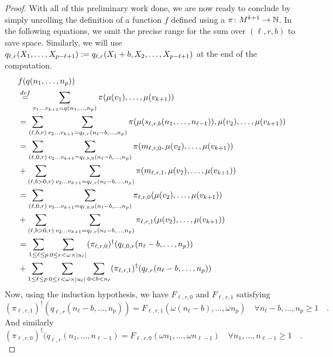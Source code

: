 \begin{proof}
	With all of this preliminary work done, we are now ready to conclude by
	simply unrolling the definition of
	a function
	$f$ defined using a 
	$\pi \colon M^{k+1} \to \mathbb{N}$.
	In the following equations, we omit the precise
	range for the sum over $(\ell, r, b)$ to save space.
	Similarly, we will use
	$q_{\ell,r}(X_1, \dots, X_{p-\ell+1})
		\mathrel{:=} q_{\ell,r}(X_1+b, X_2, \dots, X_{p - \ell + 1})$
	at the end of the computation.
	\begin{align*}
		 & f(q(n_1, \dots, n_p))           \\
		 & \eqdef
		\sum_{v_1 \dots v_{k+1} = q(n_1, \dots, n_p)}
		\pi(\mu(v_1), \dots, \mu(v_{k+1})) \\
		 & = \sum_{(\ell, b, r)}
		\sum_{v_2 \dots v_{k+1} = q_{\ell,r}(n_\ell - b, \dots, n_p)}
		\pi(\mu(s_{\ell,r,b}(n_1, \dots, n_{\ell-1})), \mu(v_2), \dots, \mu(v_{k+1}))
		\\
		 & =
		\sum_{(\ell, 0, r)}
		\sum_{v_2 \dots v_{k+1} = q_{\ell,b,0}(n_\ell - b, \dots, n_p)}
		\pi(m_{\ell,r,0}, \mu(v_2), \dots, \mu(v_{k+1}))
		\\
		 & +
		\sum_{(\ell, b > 0, r)}
		\sum_{v_2 \dots v_{k+1} = q_{\ell,r}(n_\ell - b, \dots, n_p)}
		\pi(m_{\ell,r,1}, \mu(v_2), \dots, \mu(v_{k+1}))
		\\
		 & =
		\sum_{(\ell, 0, r)}
		\sum_{v_2 \dots v_{k+1} = q_{\ell,b,0}(n_\ell - b, \dots, n_p)}
		\pi_{\ell,r,0}(\mu(v_2), \dots, \mu(v_{k+1}))
		\\
		 & +
		\sum_{(\ell, b > 0, r)}
		\sum_{v_2 \dots v_{k+1} = q_{\ell,r}(n_\ell-b, \dots, n_p)}
		\pi_{\ell,r,1}(\mu(v_2), \dots, \mu(v_{k+1}))
		\\
		 & =
		\sum_{1 \leq \ell \leq p}
		\sum_{0 \leq r < \omega \times \card{u_\ell}}
		(\pi_{\ell,r,0})^\dagger (q_{\ell, 0, r}(n_\ell-b, \dots, n_p))
		\\
		 & +
		\sum_{1 \leq \ell \leq p}
		\sum_{0 \leq r < \omega \times \card{u_\ell}}
		\sum_{0 < b < n_\ell}
		(\pi_{\ell,r,1})^{\dagger}(q_{\ell,r}(n_\ell - b, \dots, n_p))
	\end{align*}
	Now, using the induction hypothesis,
	we have  $F_{\ell,r,0}$ and $F_{\ell,r,1}$
	satisfying
	\begin{equation*}
		(\pi_{\ell,r,1})^{\dagger}(q_{\ell,r}(n_\ell - b, \dots, n_p))
		= F_{\ell,r,1}(\omega (n_\ell - b), \dots, \omega n_p)
		\quad
		\forall n_\ell - b, \dots, n_p \geq 1
		\quad .
	\end{equation*}
	And similarly
	\begin{equation*}
		(\pi_{\ell,r,0})^{\dagger}(q_{\ell,r}(n_1, \dots, n_{\ell-1})
		= F_{\ell,r,0}(\omega n_1, \dots, \omega n_{\ell-1})
		\quad
		\forall n_1, \dots, n_{\ell - 1} \geq 1
		\quad .
	\end{equation*}


\end{proof}
